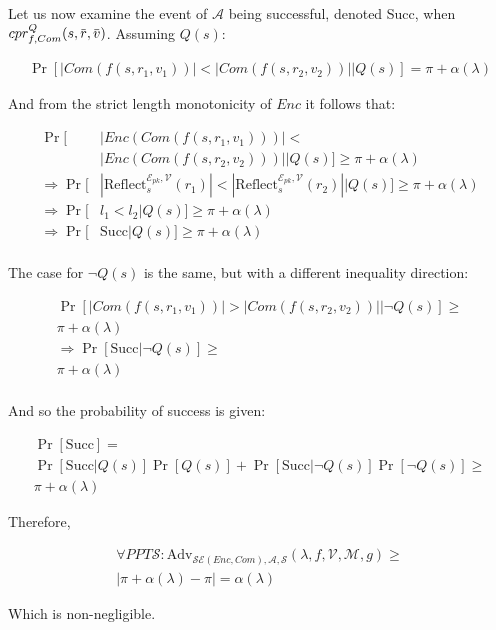 \documentclass[conference, letterpaper, 10pt]{IEEEtran}
\newcommand{\overbar}[1]{\mkern 1.5mu\overline{\mkern-1.5mu#1\mkern-1.5mu}\mkern 1.5mu}
\begin{document}
\begin{IEEEproof}
Let us now examine the event of $\mathcal{A}$ being successful, denoted Succ,
when $cpr^Q_{f, Com}(s, \overbar{r}, \overbar{v})$. Assuming $Q(s)$:

\begin{align*}
    \Pr[|Com(f(s, r_1, v_1))| < |Com(f(s, r_2, v_2))||Q(s)]
    = \pi + \alpha(\lambda)
\end{align*}

And from the strict length monotonicity of $Enc$ it follows that:

\begin{align*}
    \Pr[&|Enc(Com(f(s, r_1, v_1)))| <\\&|Enc(Com(f(s, r_2, v_2)))||Q(s)]
        \geq \pi + \alpha(\lambda)\\
    \Rightarrow \Pr[&
        |\text{Reflect}^{\mathcal{E}_{pk}, \mathcal{V}}_s(r_1)|
        <
        |\text{Reflect}^{\mathcal{E}_{pk}, \mathcal{V}}_s(r_2)||Q(s)
    ]
        \geq \pi + \alpha(\lambda)\\
    \Rightarrow \Pr[&l_1 < l_2|Q(s)]
        \geq \pi + \alpha(\lambda)\\
    \Rightarrow \Pr[&\text{Succ}|Q(s)]
        \geq \pi + \alpha(\lambda)\\
\end{align*}

The case for $\lnot Q(s)$ is the same, but with a different inequality direction:

\begin{align*}
    \Pr[|Com(f(s, r_1, v_1))| > |Com(f(s, r_2, v_2))||\lnot Q(s)]
        \geq\\
        \pi + \alpha(\lambda)\\
    \Rightarrow \Pr[\text{Succ}|\lnot Q(s)] \geq\\
    \pi + \alpha(\lambda)\\
\end{align*}

And so the probability of success is given:

\begin{align*}
    \Pr[\text{Succ}] =\\
    \Pr[\text{Succ}|Q(s)]\Pr[Q(s)]
    +
    \Pr[\text{Succ}|\lnot Q(s)]\Pr[\lnot Q(s)] \geq\\
    \pi + \alpha(\lambda)
\end{align*}

Therefore,

\begin{align*}
    \forall PPT \mathcal{S}:
    \text{Adv}_{\mathcal{SE}(Enc, Com), \mathcal{A}, \mathcal{S}}
        (\lambda, f, \mathcal{V}, \mathcal{M}, g)
    \geq\\
    |\pi + \alpha(\lambda) - \pi| = \alpha(\lambda)
\end{align*}

Which is non-negligible.

\end{IEEEproof}
\end{document}

